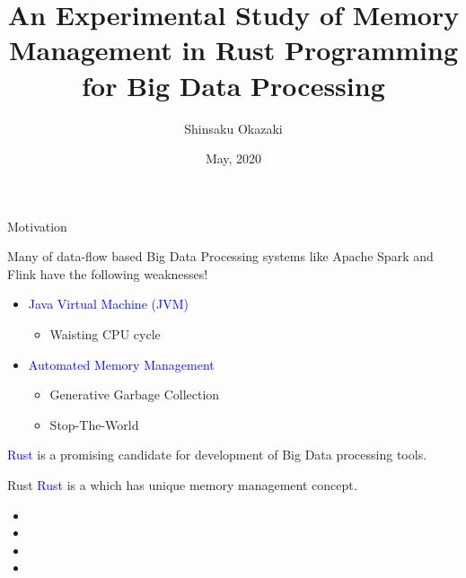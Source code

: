 \documentclass[9pt]{beamer}
\title[]{An Experimental Study of Memory Management in Rust Programming for Big Data Processing}
\date{May, 2020}
\author[Shinsaku Okazaki]{Shinsaku Okazaki}
\institute{Boston University}
\begin{document}
\maketitle








\begin{frame}[fragile]{Motivation}


    Many of data-flow based Big Data Processing systems like Apache Spark and Flink have the following weaknesses! 
    \vspace{0.5cm}
    \begin{itemize}
        \item \textcolor{blue}{Java Virtual Machine (JVM)}
        \begin{itemize}
            \item Waisting CPU cycle
        \end{itemize}
        \item \textcolor{blue}{Automated Memory Management}
        \begin{itemize}
            \item Generative Garbage Collection
            \item Stop-The-World
        \end{itemize}
    \end{itemize}
    \vspace{0.5cm}
\textcolor{blue}{Rust} is a promising candidate for development of Big Data processing tools.



\end{frame}



\begin{frame}[t, fragile]{Rust}
    \textcolor{blue}{Rust} is a  which has unique memory management concept.
    \vspace{0.5cm}
    \begin{itemize}
        \item {} 
        \item {}
        \item {}
        \item {} 
    \end{itemize}
\end{frame}
\end{document}
